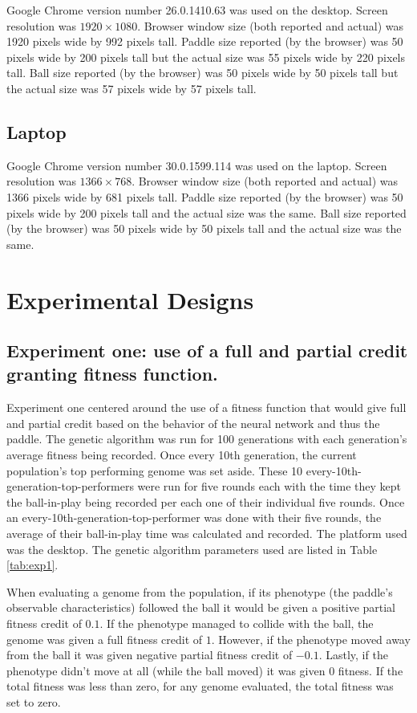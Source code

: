 \documentclass[a4paper,10pt]{article}
\begin{document}
Google Chrome version number 26.0.1410.63 was used on the desktop. Screen resolution was $1920\times1080$. Browser window size (both reported and actual) was 1920 pixels wide by 992 pixels tall. Paddle size reported (by the browser) was 50 pixels wide by 200 pixels tall but the actual size was 55 pixels wide by 220 pixels tall. Ball size reported (by the browser) was 50 pixels wide by 50 pixels tall but the actual size was 57 pixels wide by 57 pixels tall.

\subsection{Laptop}

Google Chrome version number 30.0.1599.114 was used on the laptop. Screen resolution was $1366\times768$. Browser window size (both reported and actual) was 1366 pixels wide by 681 pixels tall. Paddle size reported (by the browser) was 50 pixels wide by 200 pixels tall and the actual size was the same. Ball size reported (by the browser) was 50 pixels wide by 50 pixels tall and the actual size was the same. 

\section{Experimental Designs}

\subsection{Experiment one: use of a full and partial credit granting fitness function.}

Experiment one centered around the use of a fitness function that would give full and partial credit based on the behavior of the neural network and thus the paddle. The genetic algorithm was run for 100 generations with each generation's average fitness being recorded. Once every 10th generation, the current population's top performing genome was set aside. These 10 every-10th-generation-top-performers were run for five rounds each with the time they kept the ball-in-play being recorded per each one of their individual five rounds. Once an every-10th-generation-top-performer was done with their five rounds, the average of their ball-in-play time was calculated and recorded. The platform used was the desktop. The genetic algorithm parameters used are listed in Table \ref{tab:exp1}.

When evaluating a genome from the population, if its phenotype (the paddle's observable characteristics) followed the ball it would be given a positive partial fitness credit of $0.1$. If the phenotype managed to collide with the ball, the genome was given a full fitness credit of $1$. However, if the phenotype moved away from the ball it was given negative partial fitness credit of $-0.1$. Lastly, if the phenotype didn't move at all (while the ball moved) it was given $0$ fitness. If the total fitness was less than zero, for any genome evaluated, the total fitness was set to zero. 
\end{document}
